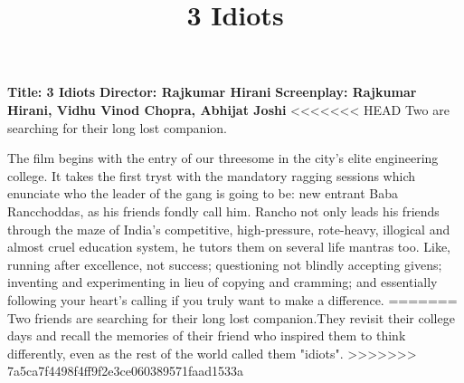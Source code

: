 \documentclass[10.5pt, a4paper]{article}
\title{3 Idiots}
\begin{document}
\maketitle
\textbf{Title: 3 Idiots}
\textbf{Director: Rajkumar Hirani}
\textbf{Screenplay: Rajkumar Hirani, Vidhu Vinod Chopra, Abhijat Joshi}
<<<<<<< HEAD
Two  are searching for their long lost companion.

The film begins with the entry of our threesome in the city's elite engineering college.
 It takes the first tryst with the mandatory ragging sessions which enunciate who the leader
 of the gang is going to be: new entrant Baba Rancchoddas, as his friends fondly call him. Rancho not only leads
 his friends through the maze of India's competitive, high-pressure, rote-heavy, illogical and almost cruel
 education system, he tutors them on several life mantras too. Like, running after excellence, not success;
 questioning not blindly accepting givens; inventing and experimenting in lieu of copying and cramming;
 and essentially following your heart's calling if you truly want to make
 a difference.
=======
Two friends are searching for their long lost companion.They revisit their college days 
and recall the memories of their friend who inspired them to think differently, 
even as the rest of the world called them "idiots". 
>>>>>>> 7a5ca7f4498f4ff9f2e3ce060389571faad1533a
\end{document}
